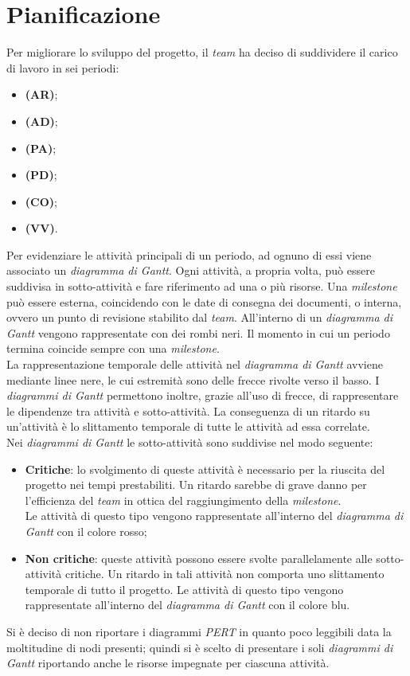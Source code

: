 \newpage
\section{Pianificazione}
Per migliorare lo sviluppo del progetto, il \textit{team} ha deciso di suddividere il carico di lavoro in sei periodi:
\begin{itemize}
	\item \textbf{\AR (AR)};
	\item \textbf{\AD (AD)};
	\item \textbf{\PA (PA)};
	\item \textbf{\PD (PD)};
	\item \textbf{\CO (CO)};
	\item \textbf{\VV (VV)}.
\end{itemize}

Per evidenziare le attività principali di un periodo, ad ognuno di essi viene associato un \textit{diagramma di Gantt}. 
Ogni attività, a propria volta, può essere suddivisa in sotto-attività e fare riferimento ad una o più risorse.
Una \textit{milestone} può essere esterna, coincidendo con le date di consegna dei documenti, o interna, ovvero un punto di revisione stabilito dal \textit{team}. 
All'interno di un \textit{diagramma di Gantt} vengono rappresentate con dei rombi neri. 
Il momento in cui un periodo termina coincide sempre con una \textit{milestone}.\\ 
La rappresentazione temporale delle attività nel \textit{diagramma di Gantt} avviene mediante linee nere, le cui estremità sono delle frecce rivolte verso il basso. 
I \textit{diagrammi di Gantt} permettono inoltre, grazie all'uso di frecce, di rappresentare le dipendenze tra attività e sotto-attività.
La conseguenza di un ritardo su un'attività è lo slittamento temporale di tutte le attività ad essa correlate. \\

Nei \textit{diagrammi di Gantt} le sotto-attività sono suddivise nel modo seguente:
\begin{itemize}
	\item \textbf{Critiche}: lo svolgimento di queste attività è necessario per la riuscita del progetto nei tempi prestabiliti. Un ritardo sarebbe di grave danno per l'efficienza del \textit{team} in ottica del raggiungimento della \textit{milestone}. \\ 
	Le attività di questo tipo vengono rappresentate all'interno del \textit{diagramma di Gantt} con il colore rosso;
	\item \textbf{Non critiche}: queste attività possono essere svolte parallelamente alle sotto-attività critiche. Un ritardo in tali attività non comporta uno slittamento temporale di tutto il progetto.
	Le attività di questo tipo vengono rappresentate all'interno del \textit{diagramma di Gantt} con il colore blu.
\end{itemize}
Si è deciso di non riportare i diagrammi \textit{PERT} in quanto poco leggibili data la moltitudine di nodi presenti; quindi si è scelto di presentare i soli \textit{diagrammi di Gantt} riportando anche le risorse impegnate per ciascuna attività.

